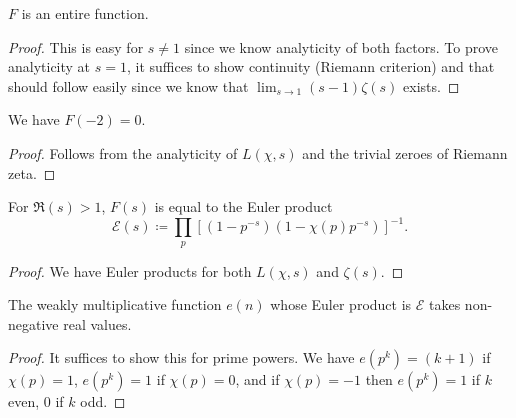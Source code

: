  \begin{lemma}
  $F$ is an entire function.
 \end{lemma}

 \begin{proof}
  This is easy for $s \ne 1$ since we know analyticity of both factors. To prove analyticity at $s = 1$, it suffices to show continuity (Riemann criterion) and that should follow easily since we know that $\lim_{s \to 1} (s - 1) \zeta(s)$ exists.
 \end{proof}

 \begin{lemma}
  We have $F(-2) = 0$.
 \end{lemma}

 \begin{proof}
  Follows from the analyticity of $L(\chi, s)$ and the trivial zeroes of Riemann zeta.
 \end{proof}

 \begin{lemma}
  For $\Re(s) > 1$, $F(s)$ is equal to the Euler product
  \[ \mathcal{E}(s) \coloneqq \prod_p \left[ (1 - p^{-s}) (1 - \chi(p) p^{-s})\right]^{-1}. \]
 \end{lemma}

 \begin{proof}
  We have Euler products for both $L(\chi, s)$ and $\zeta(s)$.
 \end{proof}

 \begin{lemma}
  The weakly multiplicative function $e(n)$ whose Euler product is $\mathcal{E}$ takes non-negative real values.
 \end{lemma}

 \begin{proof}
  It suffices to show this for prime powers. We have $e(p^k) = (k + 1)$ if $\chi(p) = 1$, $e(p^k) = 1$ if $\chi(p) = 0$, and if $\chi(p) = -1$ then $e(p^k) = 1$ if $k$ even, $0$ if $k$ odd.
 \end{proof}